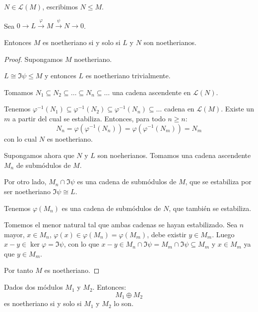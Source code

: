 \begin{nt}
  \(N\in\mathcal{L}(M)\), escribimos \(N\le M\).
\end{nt}

\begin{prop}\label{prop:suc_noether}
  Sea \(0\longrightarrow L\overset{\varphi}{\longrightarrow}
  M\overset{\psi}{\longrightarrow} N
  \longrightarrow 0\).

  Entonces \(M\) es noetheriano si y solo si \(L\) y \(N\) son
  noetherianos.
\end{prop}

\begin{proof}
  Supongamos \(M\) noetheriano.

  \(L\cong \Im\psi\le M\) y entonces \(L\) es noetheriano trivialmente.

  Tomamos \(N_1\subseteq N_2\subseteq\ldots\subseteq N_n\subseteq\ldots\)
  una cadena ascendente en \(\mathcal{L}(N)\).

  Tenemos \(\varphi^{-1}(N_1)\subseteq \varphi^{-1}(N_2)
  \subseteq \varphi^{-1}(N_n)\subseteq\ldots\)
  cadena en \(\mathcal{L}(M)\). Existe un \(m\) a partir del cual
  se estabiliza. Entonces, para todo \(n\ge n\):
  \[
    N_n=\varphi(\varphi^{-1}(N_n))=\varphi(\varphi^{-1}(N_m))=N_m
  \]
  con lo cual \(N\) es noetheriano.


  Supongamos ahora que \(N\) y \(L\) son noeherianos.
  Tomamos una cadena ascendente \(M_n\) de submódulos de \(M\).

  Por otro lado, \(M_n\cap\Im\psi\) es una cadena de submódulos de
  \(M\), que se estabiliza por ser noetheriano \(\Im\psi\cong L\).

  Tenemos \(\varphi(M_n)\) es una cadena de submódulos de \(N\),
  que también se estabiliza.

  Tomemos el menor natural tal que ambas cadenas se hayan estabilizado.
  Sea \(n\) mayor, \(x\in M_n\), \(\varphi(x)\in\varphi(M_n)
  =\varphi(M_m)\), debe existir \(y\in M_m\). Luego \(x-y\in\ker\varphi
  =\Im\psi\), con lo que \(x-y\in M_n\cap\Im\psi=M_m\cap\Im\psi\subseteq M_m\)
  y \(x\in M_m\) ya que \(y\in M_m\).

  Por tanto \(M\) es noetheriano.
\end{proof}

\begin{cor}
  Dados dos módulos \(M_1\) y \(M_2\).
  Entonces:
  \[
    M_1\oplus M_2
  \]
  es noetheriano si y solo si \(M_1\) y \(M_2\) lo son.
\end{cor}

